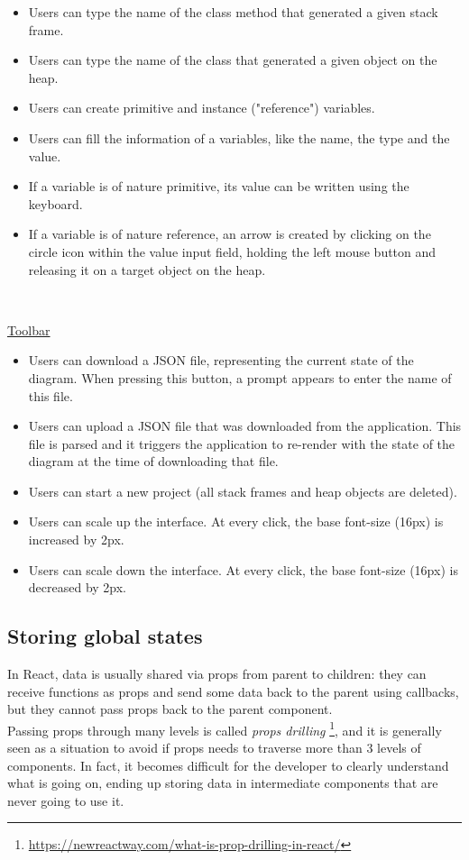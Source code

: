 \documentclass[]{usiinfbachelorproject}
\begin{document}
\begin{itemize}
	\item Users can type the name of the class method that generated a given stack frame.
	\item Users can type the name of the class that generated a given object on the heap.
	\item Users can create primitive and instance ("reference") variables.
	\item Users can fill the information of a variables, like the name, the type and the value.
	\item If a variable is of nature primitive, its value can be written using the keyboard.
	\item If a variable is of nature reference, an arrow is created by clicking on the circle icon within the value input field, holding the left mouse button and releasing it on a target object on the heap.
\end{itemize}\

\ul{Toolbar}

\begin{itemize}
	\item Users can download a JSON file, representing the current state of the diagram. When pressing this button, a prompt appears to enter the name of this file.
	\item Users can upload a JSON file that was downloaded from the application. This file is parsed and it triggers the application to re-render with the state of the diagram at the time of downloading that file.
	\item Users can start a new project (all stack frames and heap objects are deleted).
	\item Users can scale up the interface. At every click, the base font-size (16px) is increased by 2px.
	\item Users can scale down the interface. At every click, the base font-size (16px) is decreased by 2px.
\end{itemize}

\subsection{Storing global states} \label{storing states}

In React, data is usually shared via props from parent to children: they can receive functions as props and send some data back to the parent using callbacks, but they cannot pass props back to the parent component.\\ Passing props through many levels is called \emph{props drilling} \footnote{\url{https://newreactway.com/what-is-prop-drilling-in-react/}}, and it is generally seen as a situation to avoid if props needs to traverse more than 3 levels of components. In fact, it becomes difficult for the developer to clearly understand what is going on, ending up storing data in intermediate components that are never going to use it.\\
\end{document}
